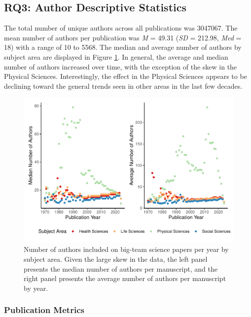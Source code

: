 \documentclass[
  man,mask,floatsintext]{apa7}
\begin{document}
\hypertarget{rq3-author-descriptive-statistics-1}{%
\subsection{RQ3: Author Descriptive Statistics}\label{rq3-author-descriptive-statistics-1}}

The total number of unique authors across all publications was
3047067. The mean number of authors per publication was \emph{M} =
49.31 (\emph{SD} = 212.98, \emph{Med} = 18) with a
range of 10 to 5568. The median and average
number of authors by subject area are displayed in Figure
\ref{fig:fig-author-year}. In general, the average and median number of
authors increased over time, with the exception of the skew in the
Physical Sciences. Interestingly, the effect in the Physical Sciences
appears to be declining toward the general trends seen in other areas in
the last few decades.

\begin{figure}
\centering
\includegraphics{manuscript_scopus_files/figure-latex/fig-author-year-1.pdf}
\caption{\label{fig:fig-author-year}Number of authors included on big-team science papers per year by subject area. Given the large skew in the data, the left panel presents the median number of authors per manuscript, and the right panel presents the average number of authors per manuscript by year.}
\end{figure}

\hypertarget{publication-metrics-1}{%
\subsubsection{Publication Metrics}\label{publication-metrics-1}}
\end{document}
